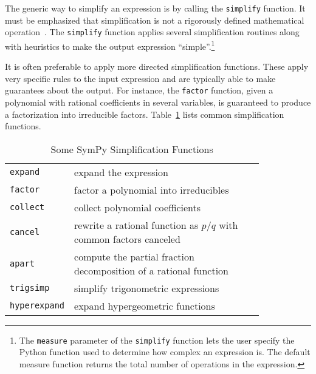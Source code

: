 



The generic way to simplify an expression is by calling the \texttt{simplify}
function.
It must be emphasized that simplification is not a rigorously defined
mathematical operation~\cite{Moses1971simplification}.
The \texttt{simplify} function applies several simplification routines along
with heuristics to make the output expression ``simple''.\footnote{The
\texttt{measure} parameter of the \texttt{simplify}
function lets the user specify the Python function used to determine how complex an
expression is.  The default measure function returns the total number of
operations in the expression.}

It is often preferable to apply more directed simplification functions. These
apply very specific rules to the input expression and are typically able to make
guarantees about the output. For instance, the \texttt{factor} function,
given a polynomial with rational coefficients in several variables,
is guaranteed to
produce a factorization into irreducible factors. Table~\ref{simplify-table}
lists common simplification functions.

\begin{center}
\begin{table}[htbc]
\caption{Some SymPy Simplification Functions}\label{simplify-table}
\begin{tabular}{lp{0.83\linewidth}}
\toprule
\verb|expand| & expand the expression \\
\verb|factor| & factor a polynomial into irreducibles \\
\verb|collect| & collect polynomial coefficients \\
\verb|cancel| & rewrite a rational function as $p/q$ with common factors
canceled \\
\verb|apart| & compute the partial fraction decomposition of a rational function
\\
\verb|trigsimp| & simplify trigonometric expressions~\cite{fu2006automated} \\
\verb|hyperexpand| & expand hypergeometric functions~\cite{Roach1996hyper,roach1997meijerg} \\
\bottomrule
\end{tabular}
\end{table}
\end{center}
